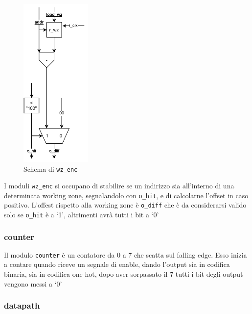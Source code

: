 \documentclass[a4paper]{article}
\begin{document}
\begin{figure}
  \includegraphics[width=3.5cm]{schema-wz_enc.pdf}
  \caption{Schema di \texttt{wz\_enc}}
\end{figure}

I moduli \texttt{wz\_enc} si occupano di stabilire se un indirizzo sia all'interno di una determinata working zone, segnalandolo con \texttt{o\_hit}, e di calcolarne l'offset in caso positivo. L'offest rispetto alla working zone è \texttt{o\_diff} che è da considerarsi valido solo se \texttt{o\_hit} è a `1', altrimenti avrà tutti i bit a `0'

\subsubsection{counter}

Il modulo \texttt{counter} è un contatore da 0 a 7 che scatta sul falling edge. Esso inizia a contare quando riceve un segnale di enable, dando l'output sia in codifica binaria, sia in codifica one hot, dopo aver sorpassato il 7 tutti i bit degli output vengono messi a `0'

\subsubsection{datapath}
\end{document}
